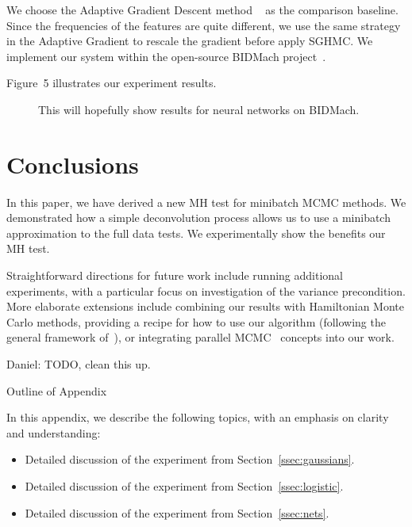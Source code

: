 \documentclass{article}
\begin{document}
We choose the Adaptive Gradient Descent method ~\cite{adapGrad} as the comparison baseline. Since the frequencies of the features are quite different, we use the same strategy in the Adaptive Gradient to rescale the gradient before apply SGHMC. We implement our system within the open-source BIDMach project~\cite{canny2013bidmach}.  

Figure~5 illustrates our experiment results.  
\begin{figure}[t]
  \centering
  \fbox{\rule[-.5cm]{0cm}{4cm} \rule[-.5cm]{4cm}{0cm}}
  \caption{This will hopefully show results for neural networks on BIDMach.}
\end{figure}




\section{Conclusions}\label{sec:conclusion}

In this paper, we have derived a new MH test for minibatch MCMC methods. We demonstrated how a
simple deconvolution process allows us to use a minibatch approximation to the full data tests. We
experimentally show the benefits our MH test.

Straightforward directions for future work include running additional experiments, with a particular
focus on investigation of the variance precondition.  More elaborate extensions include combining
our results with Hamiltonian Monte Carlo methods, providing a recipe for how to use our algorithm
(following the general framework of~\cite{sgmcmc_2015}), or integrating parallel
MCMC~\cite{conf/uai/AngelinoKWSA14,conf/icml/AhnSW14} concepts into our work.

{\color{blue}
Daniel: TODO, clean this up.
}

\small


\normalsize

\clearpage
\appendix

\begin{center}
{\Large Outline of Appendix}
\end{center}

In this appendix, we describe the following topics, with an emphasis on clarity and understanding:

\begin{itemize}[noitemsep]
    \item Detailed discussion of the experiment from Section~\ref{ssec:gaussians}.
    \item Detailed discussion of the experiment from Section~\ref{ssec:logistic}.
    \item Detailed discussion of the experiment from Section~\ref{ssec:nets}.
\end{itemize}
\end{document}
